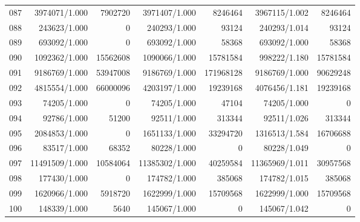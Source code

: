 \begin{longtable}{crrrrrr}
087 & 3974071/1.000 & 7902720 & 3971407/1.000 & 8246464 & 3967115/1.002 & 8246464 \\
088 & 243623/1.000 & 0 & 240293/1.000 & 93124 & 240293/1.014 & 93124 \\
089 & 693092/1.000 & 0 & 693092/1.000 & 58368 & 693092/1.000 & 58368 \\
090 & 1092362/1.000 & 15562608 & 1090066/1.000 & 15781584 & 998222/1.180 & 15781584 \\
091 & 9186769/1.000 & 53947008 & 9186769/1.000 & 171968128 & 9186769/1.000 & 90629248 \\
092 & 4815554/1.000 & 66000096 & 4203197/1.000 & 19239168 & 4076456/1.181 & 19239168 \\
093 & 74205/1.000 & 0 & 74205/1.000 & 47104 & 74205/1.000 & 0 \\
094 & 92786/1.000 & 51200 & 92511/1.000 & 313344 & 92511/1.026 & 313344 \\
095 & 2084853/1.000 & 0 & 1651133/1.000 & 33294720 & 1316513/1.584 & 16706688 \\
096 & 83517/1.000 & 68352 & 80228/1.000 & 0 & 80228/1.049 & 0 \\
097 & 11491509/1.000 & 10584064 & 11385302/1.000 & 40259584 & 11365969/1.011 & 30957568 \\
098 & 177430/1.000 & 0 & 174782/1.000 & 385068 & 174782/1.015 & 385068 \\
099 & 1620966/1.000 & 5918720 & 1622999/1.000 & 15709568 & 1622999/1.000 & 15709568 \\
100 & 148339/1.000 & 5640 & 145067/1.000 & 0 & 145067/1.042 & 0 \\
\end{longtable}

